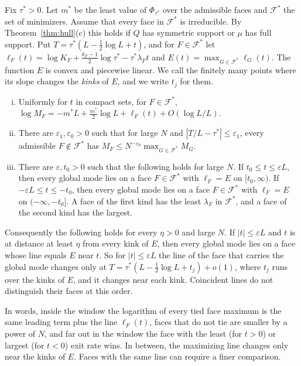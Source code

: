 \begin{theorem}\label{thm:window}
Fix $\tau^*>0$. Let $m^*$ be the least value of $\Phi_{\tau^*}$ over the
admissible faces and $\mathcal F^*$ the set of minimizers. Assume that every
face in $\mathcal F^*$ is irreducible. By Theorem~\ref{thm:hull}(c) this holds
if $Q$ has symmetric support or $\mu$ has full support. Put $T=\tau^*(L-\frac12\log L+t)$, and for
$F\in\mathcal F^*$ let
$\ell_F(t)=\log K_F+\frac{k_F-1}2\log\tau^*-\tau^*\lambda_Ft$ and
$E(t)=\max_{G\in\mathcal F^*}\ell_G(t)$. The function $E$ is convex and piecewise linear. We call
the finitely many points where its slope changes the \emph{kinks} of $E$, and we write $t_j$ for
them.
\begin{enumerate}[(i)]
\item Uniformly for $t$ in compact sets, for $F\in\mathcal F^*$,
$\log M_F=-m^*L+\frac{m^*}2\log L+\ell_F(t)+O(\log L/L)$.
\item There are $\varepsilon_1,\varepsilon_0>0$ such that for large $N$ and
$|T/L-\tau^*|\le\varepsilon_1$, every admissible $F\notin\mathcal F^*$ has
$M_F\le N^{-\varepsilon_0}\max_{G\in\mathcal F^*}M_G$.
\item There are $\varepsilon,t_0>0$ such that the following holds for large $N$. If
$t_0\le t\le\varepsilon L$, then every global mode lies on a face $F\in\mathcal F^*$ with
$\ell_F=E$ on $[t_0,\infty)$. If $-\varepsilon L\le t\le-t_0$, then every global mode lies on a
face $F\in\mathcal F^*$ with $\ell_F=E$ on $(-\infty,-t_0]$. A face of the first kind has the
least $\lambda_F$ in $\mathcal F^*$, and a face of the second kind has the largest.
\end{enumerate}
Consequently the following holds for every $\eta>0$ and large $N$. If $|t|\le\varepsilon L$ and
$t$ is at distance at least $\eta$ from every kink of $E$, then every global mode lies on a face
whose line equals $E$ near $t$. So for $|t|\le\varepsilon L$ the line of the face that carries
the global mode changes only at $T=\tau^*(L-\frac12\log L+t_j)+o(1)$, where $t_j$ runs over the
kinks of $E$, and it changes near each kink. Coincident lines do not distinguish
their faces at this order.
\end{theorem}

In words, inside the window the logarithm of every tied face maximum is the
same leading term plus the line $\ell_F(t)$, faces that do not tie are smaller by
a power of $N$, and far out in the window the face with the least (for $t>0$) or
largest (for $t<0$) exit rate wins. In between, the maximizing line changes only near the kinks of $E$.
Faces with the same line can require a finer comparison.

